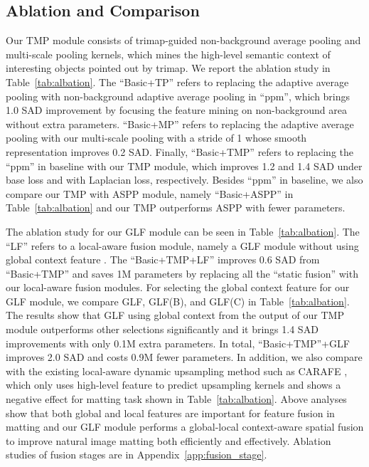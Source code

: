 \documentclass[10pt,twocolumn,letterpaper]{article}
\begin{document}
\subsection{Ablation and Comparison}
Our TMP module consists of trimap-guided non-background average pooling and multi-scale pooling kernels, which mines the high-level semantic context of interesting objects pointed out by trimap. We report the ablation study in Table~\ref{tab:albation}. The ``Basic+TP''  refers to replacing the adaptive average pooling with non-background adaptive average pooling in ``ppm'', which brings 1.0 SAD improvement by focusing the feature mining on non-background area without extra parameters. ``Basic+MP''  refers to replacing the adaptive average pooling with our multi-scale pooling with a stride of 1 whose smooth representation improves 0.2 SAD. Finally, ``Basic+TMP'' refers to replacing the ``ppm'' in baseline with our TMP module, which improves 1.2 and 1.4 SAD under base loss and with Laplacian loss, respectively. Besides ``ppm'' in baseline, we also compare our TMP with ASPP \cite{v3} module, namely ``Basic+ASPP'' in Table~\ref{tab:albation} and our TMP outperforms ASPP with fewer parameters.

The ablation study for our GLF module can be seen in Table~\ref{tab:albation}. The ``LF'' refers to  a local-aware fusion module, namely  a GLF module without using global context feature . The ``Basic+TMP+LF'' improves 0.6 SAD from ``Basic+TMP'' and saves 1M parameters by replacing all the ``static fusion'' with our local-aware fusion modules. For selecting the global context feature for our GLF module, we compare GLF, GLF(B), and GLF(C) in Table~\ref{tab:albation}. The results show that GLF using global context from the output of our TMP module outperforms other selections significantly and it brings 1.4 SAD improvements with only 0.1M extra parameters. In total, ``Basic+TMP''+GLF improves 2.0 SAD and costs 0.9M fewer parameters. In addition, we also compare with the existing local-aware dynamic upsampling method such as CARAFE \cite{carafe}, which only uses high-level feature to predict upsampling kernels and shows a negative effect for matting task shown in Table~\ref{tab:albation}. Above analyses show that both global and local features are important for feature fusion in matting and our GLF module performs a global-local context-aware spatial fusion to improve natural image matting both efficiently  and effectively. Ablation studies of fusion stages are in Appendix~\ref{app:fusion_stage}.
\end{document}
